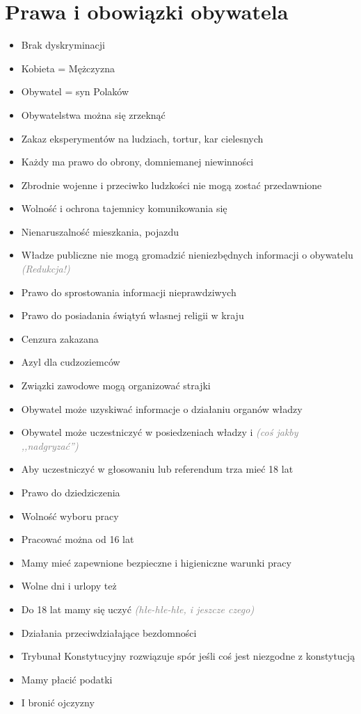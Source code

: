 \documentclass [a4paper, 12pt, oneside]{article}
\newcommand{\comment}[1]{\textcolor{Gray}{\textsf{\emph{(#1)}}}}
\begin{document}
\section{Prawa i obowiązki obywatela} %
\label{sec:prawa_i_obowi_zki_obywatela}
    \begin{itemize}
        \item Brak dyskryminacji
        \item Kobieta = Mężczyzna
        \item Obywatel = syn Polaków
        \item Obywatelstwa można się zrzeknąć
        \item Zakaz eksperymentów na ludziach, tortur, kar cielesnych
        \item Każdy ma prawo do obrony, domniemanej niewinności
        \item Zbrodnie wojenne i przeciwko ludzkości nie mogą zostać przedawnione
        \item Wolność i ochrona tajemnicy komunikowania się
        \item Nienaruszalność mieszkania, pojazdu
        \item Władze publiczne nie mogą gromadzić nieniezbędnych informacji o obywatelu \comment{Redukcja!}
        \item Prawo do sprostowania informacji nieprawdziwych
        \item Prawo do posiadania świątyń własnej religii w kraju
        \item Cenzura zakazana
        \item Azyl dla cudzoziemców
        \item Związki zawodowe mogą organizować strajki
        \item Obywatel może uzyskiwać informacje o działaniu organów władzy
        \item Obywatel może uczestniczyć w posiedzeniach władzy i \comment{coś jakby ,,nadgryzać''}
        \item Aby uczestniczyć w głosowaniu lub referendum trza mieć 18 lat
        \item Prawo do dziedziczenia
        \item Wolność wyboru pracy
        \item Pracować można od 16 lat
        \item Mamy mieć zapewnione bezpieczne i higieniczne warunki pracy
        \item Wolne dni i urlopy też
        \item Do 18 lat mamy się uczyć \comment{hłe-hłe-hłe, i jeszcze czego}
        \item Działania przeciwdziałające bezdomności
        \item Trybunał Konstytucyjny rozwiązuje spór jeśli coś jest niezgodne z konstytucją
        \item Mamy płacić podatki
        \item I bronić ojczyzny
    \end{itemize}
\end{document}
